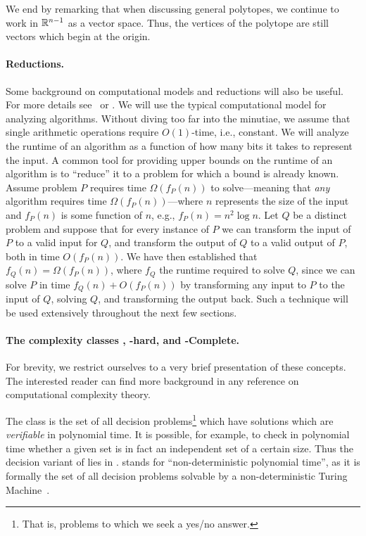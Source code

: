 We end by remarking that when discussing general  polytopes, we continue  to work  in $\mathbb{R}^{n-1}$ as a vector space. Thus,  the vertices of the polytope are still vectors which begin at the origin. 

\paragraph{Reductions.}
Some background on computational models and reductions will also be useful. For more details see~\cite{kleinberg2006algorithm} or \cite{knuth2011art}. We will use the typical computational model for analyzing algorithms. Without diving too far into the minutiae, we assume that single arithmetic operations require $O(1)$-time, i.e., constant. We will analyze the runtime of an algorithm as a function of how many bits it takes to represent the input. A common tool for providing upper bounds on the runtime of an algorithm is to ``reduce'' it to a problem for which a bound is already known. Assume problem $P$ requires time $\Omega(f_P(n))$ to solve---meaning that \emph{any} algorithm requires time $\Omega(f_P(n))$---where $n$ represents the size of the input and $f_P(n)$  is some function of $n$, e.g., $f_P(n) =  n^2\log n$. Let $Q$ be a distinct problem and suppose that for every instance of $P$ we can transform the input of $P$ to a valid input for $Q$, and transform the output of $Q$ to a valid output of $P$, both in time $O(f_P(n))$.  We have then established that $f_Q(n) = \Omega(f_P(n))$, where $f_Q$ the runtime required to solve $Q$, since we can solve $P$ in time $f_Q(n) + O(f_P(n))$ by transforming any input to $P$ to the input of $Q$, solving $Q$, and transforming the output back. Such a technique will be used extensively throughout the next few sections. 

\paragraph{The complexity classes \NP, \NP-hard, and \NP-Complete.}
For brevity, we restrict ourselves to a very brief presentation of these concepts. The interested reader can find more background in any reference  on computational  complexity theory. 

The class \NP  is  the set of all decision problems\footnote{That is,  problems  to which we seek a yes/no answer.} which have solutions which are \emph{verifiable} in polynomial time. It is possible, for example, to check  in polynomial time whether  a given  set is in fact an independent set of a certain size. Thus the decision variant of \iset lies in \NP. \NP stands for ``non-deterministic polynomial time'', as it is formally the set of all  decision problems solvable by a non-deterministic Turing  Machine~\cite{papadimitriou2003computational}. 

